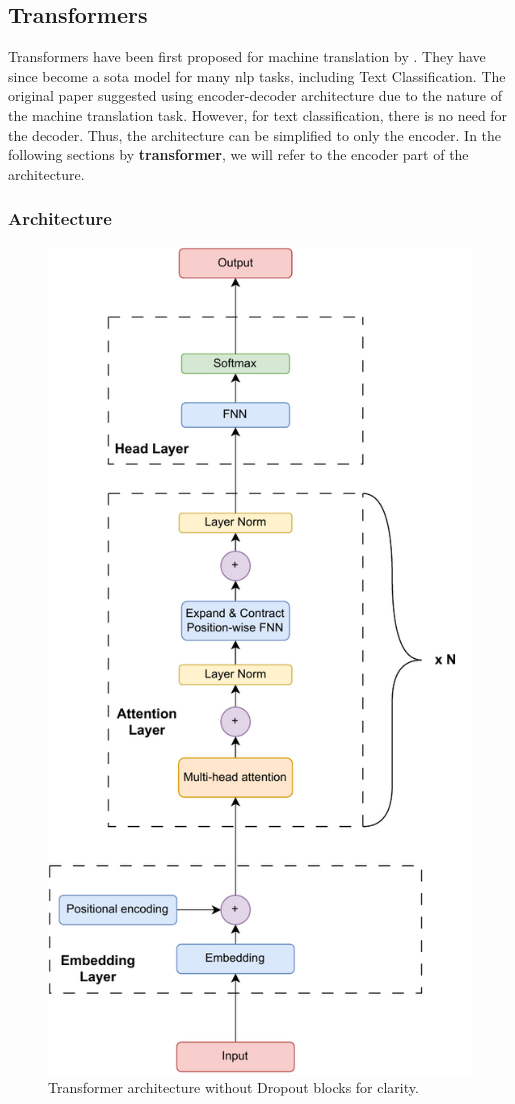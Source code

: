 \subsection{Transformers}
\label{sec:transformers}
Transformers have been first proposed for machine translation by \textcite{vaswaniAttentionAllYou2017d}.
They have since become a \ac{sota} model for many \ac{nlp} tasks, including Text Classification.
The original paper suggested using encoder-decoder architecture due to the nature of the machine translation task.
However, for text classification, there is no need for the decoder. Thus, the architecture can be simplified to only the encoder.
In the following sections by \textbf{transformer}, we will refer to the encoder part of the architecture.

\subsubsection{Architecture}
\begin{figure}[ht]
    \centering
    \includegraphics[width=0.7\linewidth]{img/transformer/trans_architecture.pdf}
    \caption{Transformer architecture without Dropout blocks for clarity.}
    \label{fig:transformer}
\end{figure}

